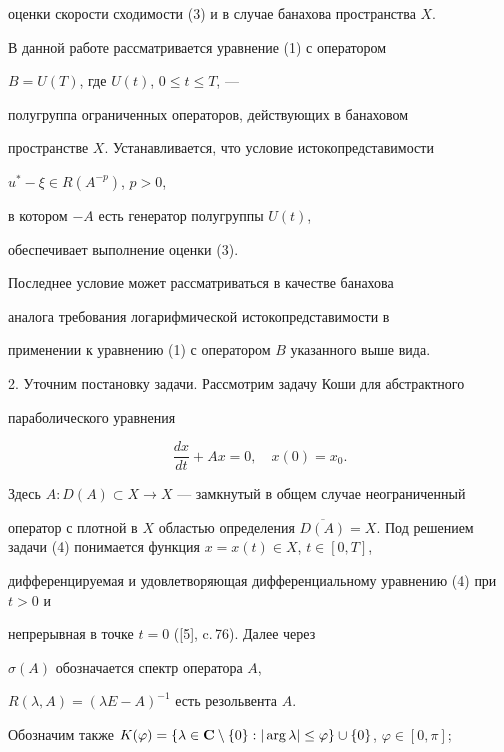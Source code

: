 оценки скорости сходимости (3) и в случае банахова пространства $X$.





В данной работе рассматривается уравнение (1) с оператором


$B=U(T)$, где $U(t)$, $0\leq t\leq T$, ---


полугруппа ограниченных операторов, действующих в банаховом


пространстве $X$. Устанавливается, что условие истокопредставимости


$u^* - \xi \in R(A^{-p})$, $p>0$,


в котором $- A$ есть генератор полугруппы $U(t)$,


обеспечивает выполнение оценки (3).


Последнее условие может рассматриваться в качестве банахова


аналога требования логарифмической истокопредставимости в


применении к уравнению (1) с оператором $B$ указанного выше вида.


\medskip





2. Уточним постановку задачи. Рассмотрим задачу Коши для абстрактного 


параболического уравнения


\begin{equation}


\frac{dx}{dt} + Ax=0,\quad x(0) = x_0.


\end{equation}


Здесь $A: D(A)\subset X\to X$ --- замкнутый в общем случае неограниченный


оператор с плотной в $X$ областью определения $\overline{D(A)} =


X$. Под решением задачи (4) понимается функция $x=x(t)\in X$, $t\in[0, T]$,


дифференцируемая и удовлетворяющая дифференциальному уравнению (4) при $t>0$ и


непрерывная в точке $t=0$ ([5], c.\,76). Далее через


$\sigma(A)$ обозначается спектр оператора $A$, 


$R(\lambda, A)=(\lambda E - A)^{-1}$ есть резольвента $A$.


Обозначим также $K(\varphi)=\{\lambda\in{\bold C}\setminus\{0\}: 


|\arg\lambda| \leq \varphi \}\cup\{0\}$, $\varphi\in [0, \pi]$; 


